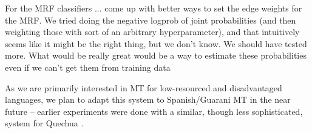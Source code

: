 \documentclass[11pt,letterpaper]{article}
\begin{document}
For the MRF classifiers ...
come up with better ways to set the edge weights for the MRF. We tried doing
the negative logprob of joint probabilities (and then weighting those with
sort of an arbitrary hyperparameter), and that intuitively seems like it might
be the right thing, but we don't know. We should have tested more. What would
be really great would be a way to estimate these probabilities even if we
can't get them from training data

As we are primarily interested in MT for low-resourced and disadvantaged
languages, we plan to adapt this system to Spanish/Guarani MT in the near
future -- earlier experiments were done with a similar, though less
sophisticated, system for Quechua \cite{rudnick:2011:RANLPStud}.



{}
\end{document}
